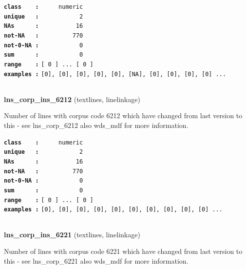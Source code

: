 \documentclass[]{article}
\begin{document}
\textbf{\texttt{class\ \ \ \ :}} \texttt{~~~~~numeric}\\
\textbf{\texttt{unique\ \ \ :}} \texttt{~~~~~~~~~~~2}\\
\textbf{\texttt{NAs\ \ \ \ \ \ :}} \texttt{~~~~~~~~~~16}\\
\textbf{\texttt{not-NA\ \ \ :}} \texttt{~~~~~~~~~770}\\
\textbf{\texttt{not-0-NA\ :}} \texttt{~~~~~~~~~~~0}\\
\textbf{\texttt{sum\ \ \ \ \ \ :}} \texttt{~~~~~~~~~~~0}\\
\textbf{\texttt{range\ \ \ \ :}}
\texttt{{[}\ 0\ {]}\ ...\ {[}\ 0\ {]}}\\
\textbf{\texttt{examples\ :}}
\texttt{{[}0{]},\ {[}0{]},\ {[}0{]},\ {[}0{]},\ {[}0{]},\ {[}NA{]},\ {[}0{]},\ {[}0{]},\ {[}0{]},\ {[}0{]}\ ...}\\

~

\textbf{lns\_corp\_ins\_6212} (textlines, linelinkage)

Number of lines with corpus code 6212 which have changed from last
version to this - see lns\_corp\_6212 also wds\_mdf for more
information.

\textbf{\texttt{class\ \ \ \ :}} \texttt{~~~~~numeric}\\
\textbf{\texttt{unique\ \ \ :}} \texttt{~~~~~~~~~~~2}\\
\textbf{\texttt{NAs\ \ \ \ \ \ :}} \texttt{~~~~~~~~~~16}\\
\textbf{\texttt{not-NA\ \ \ :}} \texttt{~~~~~~~~~770}\\
\textbf{\texttt{not-0-NA\ :}} \texttt{~~~~~~~~~~~0}\\
\textbf{\texttt{sum\ \ \ \ \ \ :}} \texttt{~~~~~~~~~~~0}\\
\textbf{\texttt{range\ \ \ \ :}}
\texttt{{[}\ 0\ {]}\ ...\ {[}\ 0\ {]}}\\
\textbf{\texttt{examples\ :}}
\texttt{{[}0{]},\ {[}0{]},\ {[}0{]},\ {[}0{]},\ {[}0{]},\ {[}0{]},\ {[}0{]},\ {[}0{]},\ {[}0{]},\ {[}0{]}\ ...}\\

~

\textbf{lns\_corp\_ins\_6221} (textlines, linelinkage)

Number of lines with corpus code 6221 which have changed from last
version to this - see lns\_corp\_6221 also wds\_mdf for more
information.
\end{document}
